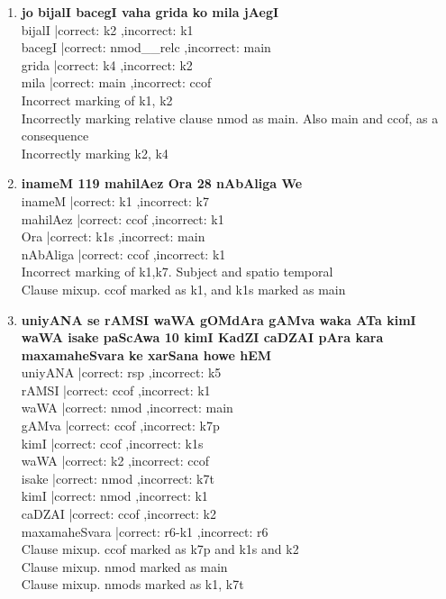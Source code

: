 \documentclass[a4 paper]{article}
\begin{document}
\begin{enumerate}
    \item \textbf{jo bijalI bacegI vaha grida ko mila jAegI}\\
        bijalI |correct: k2 ,incorrect: k1      \\
        bacegI |correct: nmod\_\_relc ,incorrect: main        \\
        grida |correct: k4 ,incorrect: k2       \\
        mila |correct: main ,incorrect: ccof        \\
        \addlinespace[1em]
        Incorrect marking of k1, k2\\
        Incorrectly marking relative clause nmod as main. Also main and ccof, 
        as a consequence\\
        Incorrectly marking k2, k4\\


    \item \textbf{inameM 119 mahilAez Ora 28 nAbAliga We}\\
        inameM |correct: k1 ,incorrect: k7      \\
        mahilAez |correct: ccof ,incorrect: k1      \\
        Ora |correct: k1s ,incorrect: main      \\
        nAbAliga |correct: ccof ,incorrect: k1      \\
        \addlinespace[1em]
        Incorrect marking of k1,k7. Subject and spatio temporal\\
        Clause mixup. ccof marked as k1, and k1s marked as main\\

    \item \textbf{uniyANA se rAMSI waWA gOMdAra gAMva waka ATa kimI waWA isake paScAwa 10 kimI KadZI caDZAI pAra kara maxamaheSvara ke xarSana howe hEM}\\
        uniyANA |correct: rsp ,incorrect: k5        \\
        rAMSI |correct: ccof ,incorrect: k1         \\
        waWA |correct: nmod ,incorrect: main        \\
        gAMva |correct: ccof ,incorrect: k7p        \\
        kimI |correct: ccof ,incorrect: k1s         \\
        waWA |correct: k2 ,incorrect: ccof      \\
        isake |correct: nmod ,incorrect: k7t        \\
        kimI |correct: nmod ,incorrect: k1      \\
        caDZAI |correct: ccof ,incorrect: k2        \\
        maxamaheSvara |correct: r6-k1 ,incorrect: r6        \\
        \addlinespace[1em]
        Clause mixup. ccof marked as k7p and k1s and k2\\
        Clause mixup. nmod marked as main\\
        Clause mixup. nmods marked as k1, k7t\\


\end{enumerate}
\end{document}
